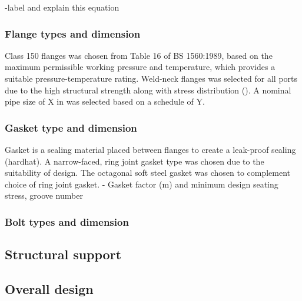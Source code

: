 -label and explain this equation

\subsubsection{Flange types and dimension}
Class 150 flanges was chosen from Table 16 of BS 1560:1989, based on the maximum permissible working pressure and temperature, which provides a suitable pressure-temperature rating. Weld-neck flanges was selected for all ports due to the high structural strength along with stress distribution ().
A nominal pipe size of X in was selected based on a schedule of Y. 
\subsubsection{Gasket type and dimension}
Gasket is a sealing material placed between flanges to create a leak-proof sealing (hardhat). A narrow-faced, ring joint gasket type was chosen due to the suitability of design. The octagonal soft steel gasket was chosen to complement choice of ring joint gasket. 
- Gasket factor (m) and minimum design seating stress, groove number

\subsubsection{Bolt types and dimension}
\subsection{Structural support}
\subsection{Overall design}

